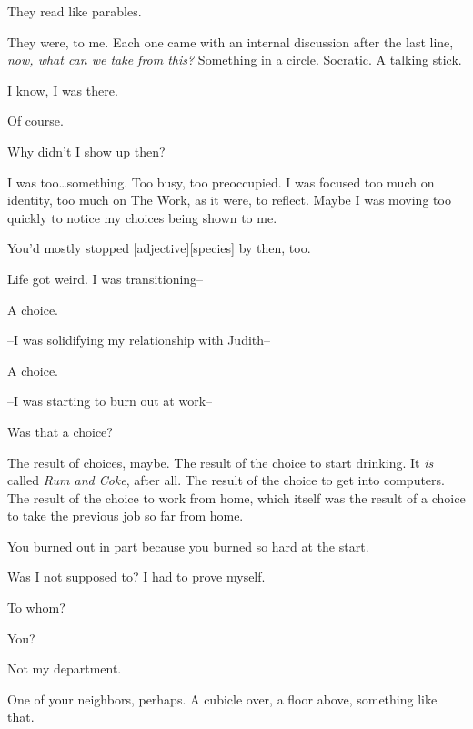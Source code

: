 \begin{paracol}{2}
\begin{leftcolumn}
\begin{ally}
They read like parables.
\end{ally}
They were, to me. Each one came with an internal discussion after the last line, \emph{now, what can we take from this?} Something in a circle. Socratic. A talking stick.

\begin{ally}
I know, I was there.
\end{ally}
Of course.

\begin{ally}
Why didn't I show up then?
\end{ally}
I was too\ldots{}something. Too busy, too preoccupied. I was focused too much on identity, too much on The Work, as it were, to reflect. Maybe I was moving too quickly to notice my choices being shown to me.

\begin{ally}
You'd mostly stopped [adjective][species] by then, too.
\end{ally}
Life got weird. I was transitioning--

\begin{ally}
A choice.
\end{ally}
--I was solidifying my relationship with Judith--

\begin{ally}
A choice.
\end{ally}
--I was starting to burn out at work--

\begin{ally}
Was that a choice?
\end{ally}
The result of choices, maybe. The result of the choice to start drinking. It \emph{is} called \emph{Rum and Coke}, after all. The result of the choice to get into computers. The result of the choice to work from home, which itself was the result of a choice to take the previous job so far from home.

\begin{ally}
You burned out in part because you burned so hard at the start.
\end{ally}
Was I not supposed to? I had to prove myself.

\begin{ally}
To whom?
\end{ally}
You?

\begin{ally}
Not my department.
\end{ally}
One of your neighbors, perhaps. A cubicle over, a floor above, something like that.


\end{leftcolumn}
\end{paracol}
